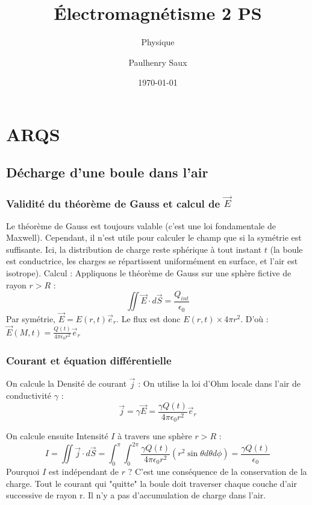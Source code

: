 \documentclass[french]{yLectureNote}
\title{Électromagnétisme 2 PS}
\subtitle{Physique}
\author{Paulhenry Saux}
\date{\today}
\renewcommand{\vec}{\overrightarrow}
\begin{document}
\chapter{ARQS}
\section{Décharge d'une boule dans l'air}

\subsection{Validité du théorème de Gauss et calcul de $\vec{E}$}
Le théorème de Gauss est toujours valable (c'est une loi fondamentale de Maxwell). Cependant, il n'est utile pour calculer le champ que si la symétrie est suffisante. Ici, la distribution de charge reste sphérique à tout instant $t$ (la boule est conductrice, les charges se répartissent uniformément en surface, et l'air est isotrope).
 Calcul :
    Appliquons le théorème de Gauss sur une sphère fictive de rayon $r > R$ :
    $$\iint \vec{E} \cdot d\vec{S} = \frac{Q_{int}}{\epsilon_0}$$
    Par symétrie, $\vec{E} = E(r, t) \vec{e}_r$. Le flux est donc $E(r, t) \times 4\pi r^2$.
    D'où : $\vec{E}(M, t) = \frac{Q(t)}{4\pi\epsilon_0 r^2} \vec{e}_r$

\subsection{Courant et équation différentielle}

On calcule la Densité de courant $\vec{j}$ :
On utilise la loi d'Ohm locale dans l'air de conductivité $\gamma$ :
$$\vec{j} = \gamma \vec{E} = \frac{\gamma Q(t)}{4\pi\epsilon_0 r^2} \vec{e}_r$$

On calcule ensuite Intensité $I$ à travers une sphère $r > R$ :
$$I = \iint \vec{j} \cdot d\vec{S} = \int_{0}^{\pi} \int_{0}^{2\pi} \frac{\gamma Q(t)}{4\pi\epsilon_0 r^2} (r^2 \sin\theta d\theta d\phi) = \frac{\gamma Q(t)}{\epsilon_0}$$
 Pourquoi $I$ est indépendant de $r$ ? C'est une conséquence de la conservation de la charge. Tout le courant qui "quitte" la boule doit traverser chaque couche d'air successive de rayon r. Il n'y a pas d'accumulation de charge dans l'air.
\end{document}
